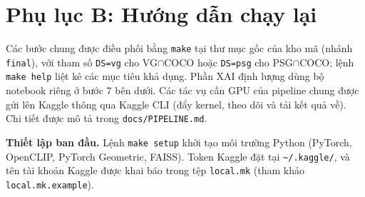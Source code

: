\documentclass[conference]{IEEEtran}
\begin{document}
\section*{Phụ lục B: Hướng dẫn chạy lại}
Các bước chung được điều phối bằng \texttt{make} tại thư mục gốc của kho mã (nhánh \texttt{final}), với tham số \texttt{DS=vg} cho VG$\cap$COCO hoặc \texttt{DS=psg} cho PSG$\cap$COCO; lệnh \texttt{make help} liệt kê các mục tiêu khả dụng. Phần XAI định lượng dùng bộ notebook riêng ở bước 7 bên dưới. Các tác vụ cần GPU của pipeline chung được gửi lên Kaggle thông qua Kaggle CLI (đẩy kernel, theo dõi và tải kết quả về). Chi tiết được mô tả trong \texttt{docs/PIPELINE.md}.

\textbf{Thiết lập ban đầu.} Lệnh \texttt{make setup} khởi tạo môi trường Python (PyTorch, OpenCLIP, PyTorch Geometric, FAISS). Token Kaggle đặt tại \texttt{\textasciitilde/.kaggle/}, và tên tài khoản Kaggle được khai báo trong tệp \texttt{local.mk} (tham khảo \texttt{local.mk.example}).
\end{document}
